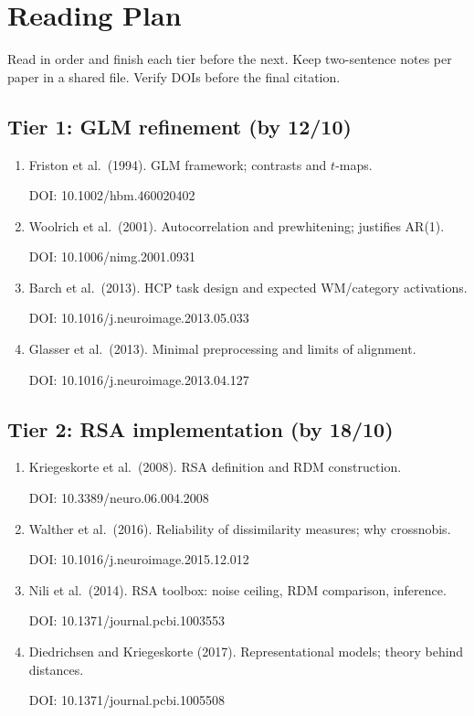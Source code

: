 \documentclass[11pt,a4paper]{article}
\begin{document}
\section{Reading Plan}

Read in order and finish each tier before the next. Keep two-sentence notes per paper in a shared file. Verify DOIs before the final citation.

\subsection*{Tier 1: GLM refinement (by 12/10)}
\begin{enumerate}[label=\arabic*.]
\item Friston et al.\ (1994). GLM framework; contrasts and $t$-maps. 

DOI: 10.1002/hbm.460020402

\item Woolrich et al.\ (2001). Autocorrelation and prewhitening; justifies AR(1). 

DOI: 10.1006/nimg.2001.0931
\item Barch et al.\ (2013). HCP task design and expected WM/category activations. 

DOI: 10.1016/j.neuroimage.2013.05.033
\item Glasser et al.\ (2013). Minimal preprocessing and limits of alignment. 

DOI: 10.1016/j.neuroimage.2013.04.127
\end{enumerate}

\subsection*{Tier 2: RSA implementation (by 18/10)}
\begin{enumerate}[label=\arabic*.,resume]
\item Kriegeskorte et al.\ (2008). RSA definition and RDM construction. 

DOI: 10.3389/neuro.06.004.2008
\item Walther et al.\ (2016). Reliability of dissimilarity measures; why crossnobis. 

DOI: 10.1016/j.neuroimage.2015.12.012
\item Nili et al.\ (2014). RSA toolbox: noise ceiling, RDM comparison, inference.

DOI: 10.1371/journal.pcbi.1003553
\item Diedrichsen and Kriegeskorte (2017). Representational models; theory behind distances. 

DOI: 10.1371/journal.pcbi.1005508
\end{enumerate}
\end{document}
